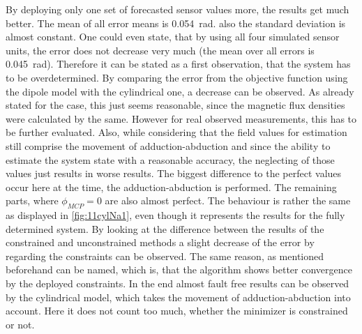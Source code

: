 By deploying only one set of forecasted sensor values more, the results get much better. The mean of all error means is \SI{0.054}{\radian}. also the standard deviation is almost constant. One could even state, that by using all four simulated sensor units, the error does not decrease very much (the mean over all errors is \SI{0.045}{\radian}). Therefore it can be stated as a first observation, that the system has to be overdetermined. 
By comparing the error from the objective function using the dipole model with the cylindrical one, a decrease can be observed. As already stated for the \grqq case, this just seems reasonable, since the magnetic flux densities were calculated by the same. However for real observed measurements, this has to be further evaluated.
Also, while considering that the field values for estimation still comprise the movement of adduction-abduction and since the ability to estimate the system state with a reasonable accuracy, the neglecting of those values just results in worse results. The biggest difference to the perfect values occur here at the time, the adduction-abduction is performed. The remaining parts, where $ \phi_{MCP} = 0 $ are also almost perfect. The behaviour is rather the same as displayed in \ref{fig:11cylNa1}, even though it represents the results for the fully determined system. By looking at the difference between the results of the constrained and unconstrained methods a slight decrease of the error by regarding the constraints can be observed. The same reason, as mentioned beforehand can be named, which is, that the algorithm shows better convergence by the deployed constraints. In the end almost fault free results can be observed by the cylindrical model, which takes the movement of adduction-abduction into account. Here it does not count too much, whether the minimizer is constrained or not. \\
